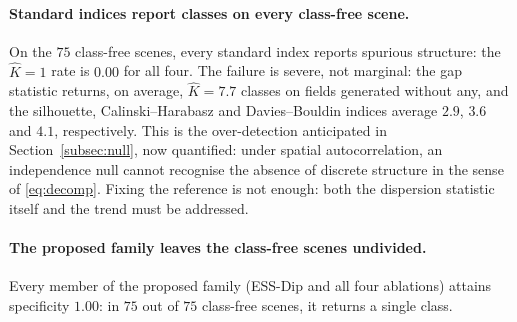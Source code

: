 \paragraph{Standard indices report classes on every class-free scene.}
On the $75$ class-free scenes, every standard index reports spurious structure:
the $\hat K{=}1$ rate is $0.00$ for all four. The failure is severe, not
marginal: the gap statistic returns, on average, $\hat K=7.7$ classes on
fields generated without any, and the silhouette, Calinski--Harabasz and
Davies--Bouldin indices average $2.9$, $3.6$ and $4.1$, respectively. This is the
over-detection anticipated in Section~\ref{subsec:null}, now quantified: under
spatial autocorrelation, an independence null cannot recognise the absence of
discrete structure in the sense of \eqref{eq:decomp}.   Fixing the reference is not enough: both the
dispersion statistic itself and the trend must be addressed.

\paragraph{The proposed family leaves the class-free scenes undivided.}
Every member of the proposed family (ESS-Dip and all four ablations)
attains specificity $1.00$: in $75$ out of $75$ class-free scenes, it returns a
single class. 

